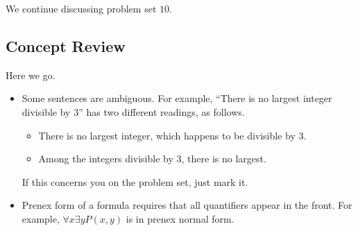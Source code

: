\documentclass[../notes.tex]{subfiles}
\begin{document}

We continue discussing problem set $10$.

\subsection{Concept Review}
Here we go.
\begin{itemize}
	\item Some sentences are ambiguous. For example, ``There is no largest integer divisible by $3$'' has two different readings, as follows.
	\begin{itemize}
		\item There is no largest integer, which happens to be divisible by $3$.
		\item Among the integers divisible by $3$, there is no largest.
	\end{itemize}
	If this concerns you on the problem set, just mark it.
	\item Prenex form of a formula requires that all quantifiers appear in the front. For example, $\forall x\exists yP(x,y)$ is in prenex normal form.
\end{itemize}
\end{document}
